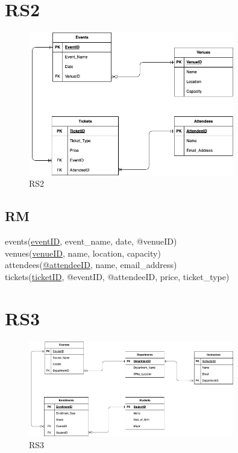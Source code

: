 \documentclass{article}
\begin{document}
\begin{CJK*}{UTF8}{gbsn}
    \section{RS2}
    \begin{figure}[H]
        \centering
        \includegraphics[width=0.8\textwidth]{RS2.png}
        \caption{RS2}
    \end{figure}
    \subsection{RM}
    events(\underline{eventID}, event\_name, date, @venueID)
    \\venues(\underline{venueID}, name, location, capacity)
    \\attendees(\underline{@attendeeID}, name, email\_address)
    \\tickets(\underline{ticketID}, @eventID, @attendeeID, price, ticket\_type)

    \section{RS3}
    \begin{figure}[H]
        \centering
        \includegraphics[width=0.8\textwidth]{RS3.png}
        \caption{RS3}
    \end{figure}

\end{CJK*}
\end{document}
